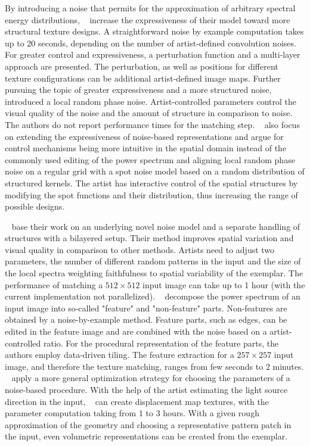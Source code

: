 By introducing a noise that permits for the approximation of arbitrary spectral energy distributions, \citeauthor*{gilet_2012_mkn}~\cite{gilet_2012_mkn} increase the expressiveness of their model toward more structural texture designs. A straightforward noise by example computation takes up to 20 seconds, depending on the number of artist-defined convolution noises. For greater control and expressiveness, a perturbation function and a multi-layer approach are presented. The perturbation, as well as positions for different texture configurations can be additional artist-defined image maps. Further pursuing the topic of greater expressiveness and a more structured noise, \citeauthor*{gilet_2014_lrn}~\cite{gilet_2014_lrn} introduced a local random phase noise. Artist-controlled parameters control the visual quality of the noise and the amount of structure in comparison to noise. The authors do not report performance times for the matching step. \citeauthor*{pavie_2016_pts}~\cite{pavie_2016_pts} also focus on extending the expressiveness of noise-based representations and argue for control mechanisms being more intuitive in the spatial domain instead of the commonly used editing of the power spectrum and aligning local random phase noise on a regular grid with a spot noise model based on a random distribution of structured kernels. The artist has interactive control of the spatial structures by modifying the spot functions and their distribution, thus increasing the range of possible designs.

\citeauthor*{guingo_2017_btm}~\cite{guingo_2017_btm} base their work on an underlying novel noise model and a separate handling of structures with a bilayered setup. Their method improves spatial variation and visual quality in comparison to other methods. Artists need to adjust two parameters, the number of different random patterns in the input and the size of the local spectra weighting faithfulness to spatial variability of the exemplar. The performance of matching a $512\times512$ input image can take up to 1 hour (with the current implementation not parallelized). \citeauthor*{kang_2017_fpt}~\cite{kang_2017_fpt} decompose the power spectrum of an input image into so-called "feature" and "non-feature" parts. Non-features are obtained by a noise-by-example method. Feature parts, such as edges, can be edited in the feature image and are combined with the noise based on a artist-controlled ratio. For the procedural representation of the feature parts, the authors employ data-driven tiling. The feature extraction for a $257\times257$ input image, and therefore the texture matching, ranges from few seconds to 2 minutes. \citeauthor*{gilet_2010_ias}~\cite{gilet_2010_ias} apply a more general optimization strategy for choosing the parameters of a noise-based procedure. With the help of the artist estimating the light source direction in the input, \citeauthor*{gilet_2010_ias}~\cite{gilet_2010_ias} can create displacement map textures, with the parameter computation taking from 1 to 3 hours. With a given rough approximation of the geometry and choosing a representative pattern patch in the input, even volumetric representations can be created from the exemplar.

